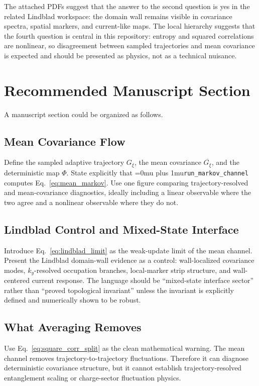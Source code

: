\documentclass[aps,prb,onecolumn,nofootinbib,superscriptaddress]{revtex4-2}
\newcommand{\src}[1]{\begingroup\ttfamily\Urlmuskip=0mu plus 1mu\relax\nolinkurl{#1}\endgroup}
\newcommand{\avg}[1]{\overline{#1}}
\newcommand{\Gtraj}{G_{\xi}}
\newcommand{\Gbar}{\avg{G_{\xi}}}
\begin{document}
The attached PDFs suggest that the answer to the second question is yes in the
related Lindblad workspace: the domain wall remains visible in covariance
spectra, spatial markers, and current-like maps.  The local hierarchy suggests
that the fourth question is central in this repository: entropy and squared
correlations are nonlinear, so disagreement between sampled trajectories and
mean covariance is expected and should be presented as physics, not as a
technical nuisance.

\section{Recommended Manuscript Section}

A manuscript section could be organized as follows.

\subsection{Mean Covariance Flow}

Define the sampled adaptive trajectory \(\Gtraj\), the mean covariance \(\Gbar\),
and the deterministic map \(\Phi\).  State explicitly that
\src{run_markov_channel} computes Eq.~\eqref{eq:mean_markov}.  Use one
figure comparing trajectory-resolved and mean-covariance diagnostics, ideally
including a linear observable where the two agree and a nonlinear observable
where they do not.

\subsection{Lindblad Control and Mixed-State Interface}

Introduce Eq.~\eqref{eq:lindblad_limit} as the weak-update limit of the mean
channel.  Present the Lindblad domain-wall evidence as a control: wall-localized
covariance modes, \(k_y\)-resolved occupation branches, local-marker strip
structure, and wall-centered current response.  The language should be
``mixed-state interface sector'' rather than ``proved topological invariant''
unless the invariant is explicitly defined and numerically shown to be robust.

\subsection{What Averaging Removes}

Use Eq.~\eqref{eq:square_corr_split} as the clean mathematical warning.  The
mean channel removes trajectory-to-trajectory fluctuations.  Therefore it can
diagnose deterministic covariance structure, but it cannot establish
trajectory-resolved entanglement scaling or charge-sector fluctuation physics.
\end{document}
